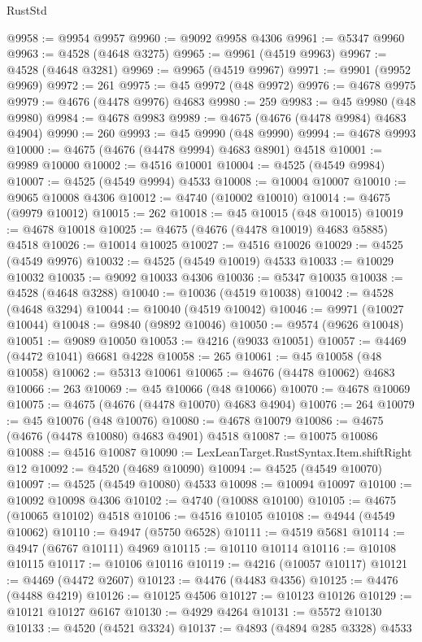 \begin{lexlean}{RustStd}
\begin{coremodule}
@9958 := @9954 @9957
@9960 := @9092 @9958 @4306
@9961 := @5347 @9960
@9963 := @4528 (@4648 @3275)
@9965 := @9961 (@4519 @9963)
@9967 := @4528 (@4648 @3281)
@9969 := @9965 (@4519 @9967)
@9971 := @9901 (@9952 @9969)
@9972 := 261
@9975 := @45 @9972 (@48 @9972)
@9976 := @4678 @9975
@9979 := @4676 (@4478 @9976) @4683
@9980 := 259
@9983 := @45 @9980 (@48 @9980)
@9984 := @4678 @9983
@9989 := @4675 (@4676 (@4478 @9984) @4683 @4904)
@9990 := 260
@9993 := @45 @9990 (@48 @9990)
@9994 := @4678 @9993
@10000 := @4675 (@4676 (@4478 @9994) @4683 @8901) @4518
@10001 := @9989 @10000
@10002 := @4516 @10001
@10004 := @4525 (@4549 @9984)
@10007 := @4525 (@4549 @9994) @4533
@10008 := @10004 @10007
@10010 := @9065 @10008 @4306
@10012 := @4740 (@10002 @10010)
@10014 := @4675 (@9979 @10012)
@10015 := 262
@10018 := @45 @10015 (@48 @10015)
@10019 := @4678 @10018
@10025 := @4675 (@4676 (@4478 @10019) @4683 @5885) @4518
@10026 := @10014 @10025
@10027 := @4516 @10026
@10029 := @4525 (@4549 @9976)
@10032 := @4525 (@4549 @10019) @4533
@10033 := @10029 @10032
@10035 := @9092 @10033 @4306
@10036 := @5347 @10035
@10038 := @4528 (@4648 @3288)
@10040 := @10036 (@4519 @10038)
@10042 := @4528 (@4648 @3294)
@10044 := @10040 (@4519 @10042)
@10046 := @9971 (@10027 @10044)
@10048 := @9840 (@9892 @10046)
@10050 := @9574 (@9626 @10048)
@10051 := @9089 @10050
@10053 := @4216 (@9033 @10051)
@10057 := @4469 (@4472 @1041) @6681 @4228
@10058 := 265
@10061 := @45 @10058 (@48 @10058)
@10062 := @5313 @10061
@10065 := @4676 (@4478 @10062) @4683
@10066 := 263
@10069 := @45 @10066 (@48 @10066)
@10070 := @4678 @10069
@10075 := @4675 (@4676 (@4478 @10070) @4683 @4904)
@10076 := 264
@10079 := @45 @10076 (@48 @10076)
@10080 := @4678 @10079
@10086 := @4675 (@4676 (@4478 @10080) @4683 @4901) @4518
@10087 := @10075 @10086
@10088 := @4516 @10087
@10090 := LexLeanTarget.RustSyntax.Item.shiftRight @12
@10092 := @4520 (@4689 @10090)
@10094 := @4525 (@4549 @10070)
@10097 := @4525 (@4549 @10080) @4533
@10098 := @10094 @10097
@10100 := @10092 @10098 @4306
@10102 := @4740 (@10088 @10100)
@10105 := @4675 (@10065 @10102) @4518
@10106 := @4516 @10105
@10108 := @4944 (@4549 @10062)
@10110 := @4947 (@5750 @6528)
@10111 := @4519 @5681
@10114 := @4947 (@6767 @10111) @4969
@10115 := @10110 @10114
@10116 := @10108 @10115
@10117 := @10106 @10116
@10119 := @4216 (@10057 @10117)
@10121 := @4469 (@4472 @2607)
@10123 := @4476 (@4483 @4356)
@10125 := @4476 (@4488 @4219)
@10126 := @10125 @4506
@10127 := @10123 @10126
@10129 := @10121 @10127 @6167
@10130 := @4929 @4264
@10131 := @5572 @10130
@10133 := @4520 (@4521 @3324)
@10137 := @4893 (@4894 @285 @3328) @4533

\end{coremodule}
\end{lexlean}
